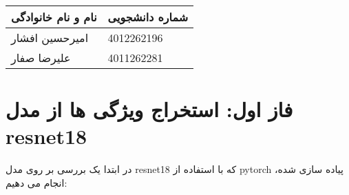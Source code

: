 \documentclass[a4paper,12pt]{article}
\begin{document}
	
	\begin{table}[h]
		\centering
		\begin{tabular}{|l|l|}
			\hline
			\textbf{نام و نام خانوادگی} & \textbf{شماره دانشجویی} \\
			\hline
			امیرحسین افشار & 4012262196 \\
			\hline
						علیرضا صفار & 4011262281 \\
			\hline
		\end{tabular}
	\end{table}
	


	
\section{فاز اول: استخراج ویژگی ها از مدل resnet18}

در ابتدا یک بررسی بر روی مدل resnet18 که با استفاده از pytorch پیاده سازی شده، انجام می دهیم:
\end{document}
